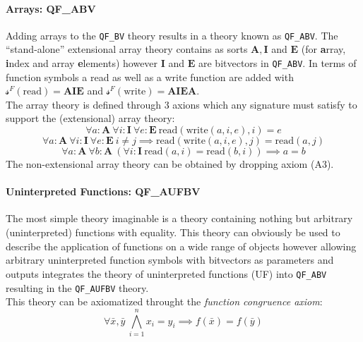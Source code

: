 \paragraph{Arrays: QF\_ABV}
Adding arrays to the \texttt{QF\_BV} theory results in a theory known as \texttt{QF\_ABV}. The \enquote{stand-alone} extensional array theory contains as sorts $\mathbf{A},\mathbf{I}$ and $\mathbf{E}$ (for \textbf{a}rray, \textbf{i}ndex and array \textbf{e}lements) however $\mathbf{I}$ and $\mathbf{E}$ are bitvectors in \texttt{QF\_ABV}. In terms of function symbols a read as well as a write function are added with $\mathcal{s}^F(\text{read})=\mathbf{A}\mathbf{I}\mathbf{E}$ and $\mathcal{s}^F(\text{write})=\mathbf{A}\mathbf{I}\mathbf{E}\mathbf{A}$.\\
The array theory is defined through 3 axions which any signature must satisfy to support the (extensional) array theory:
\begin{equation}
    \tag{A1}
    \label{eq:preliminaries:smt:a1}
    \forall a\colon\!\textbf{A}\ \forall i\colon\!\textbf{I}\ \forall e\colon\!\textbf{E}\ 
    \text{read}\left(\text{write}\left(a,i,e\right), i\right) = e
\end{equation}
\begin{equation}
    \tag{A2}
    \label{eq:preliminaries:smt:a2}
    \forall a\colon\!\textbf{A}\ \forall i\colon\!\textbf{I}\ \forall e\colon\!\textbf{E}\ 
    i \neq j \implies \text{read}\left(\text{write}\left(a,i,e\right), j\right)
    = \text{read}\left(a,j\right)
\end{equation}
\begin{equation}
    \tag{A3}
    \label{eq:preliminaries:smt:a3}
    \forall a\colon\!\textbf{A}\ \forall b\colon\!\textbf{A}\ 
    \left( \forall i\colon\!\textbf{I}\ \text{read}\left(a,i\right) = \text{read}\left(b,i\right) \right)
    \implies
    a=b
\end{equation}
The non-extensional array theory can be obtained by dropping axiom (A3).

\paragraph{Uninterpreted Functions: QF\_AUFBV}
The most simple theory imaginable is a theory containing nothing but arbitrary (uninterpreted) functions with equality. This theory can obviously be used to describe the application of functions on a wide range of objects however allowing arbitrary uninterpreted function symbols with bitvectors as parameters and outputs integrates the theory of uninterpreted functions (UF) into \texttt{QF\_ABV} resulting in the \texttt{QF\_AUFBV} theory.\\
This theory can be axiomatized throught the \textit{function congruence axiom}\cite{PreinerNiemetzBiere-DIFTS13}:
\begin{equation}
    \tag{EUF}
    \label{eq:preliminaries:smt:euf}
    \forall \bar{x},\bar{y}\ \bigwedge\limits_{i=1}^n x_i=y_i \implies f\left(\bar{x}\right) = f\left(\bar{y}\right)
\end{equation}


